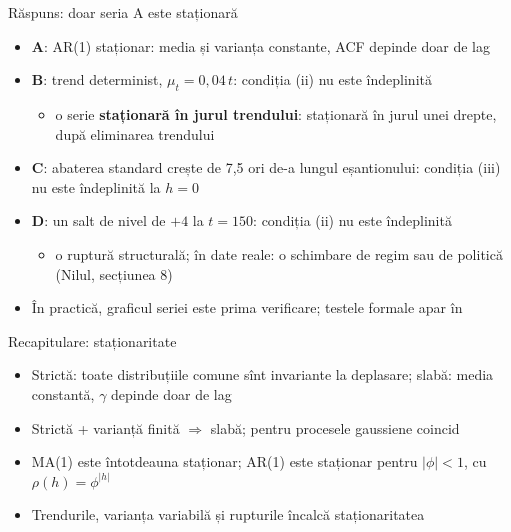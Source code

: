 \begin{frame}{Răspuns: doar seria A este staționară}
\itemsize{\small}
\begin{itemize}
    \item \textbf{A}: AR(1) staționar: media și varianța constante, ACF depinde doar de lag
    \item \textbf{B}: trend determinist, $\mu_t = 0{,}04\,t$: condiția (ii) nu este îndeplinită
    \begin{itemize}
        \item o serie \textbf{staționară în jurul trendului}: staționară în jurul unei drepte, după eliminarea trendului
    \end{itemize}
    \item \textbf{C}: abaterea standard crește de 7{,}5 ori de-a lungul eșantionului: condiția (iii) nu este îndeplinită la $h = 0$
    \item \textbf{D}: un salt de nivel de $+4$ la $t = 150$: condiția (ii) nu este îndeplinită
    \begin{itemize}
        \item o ruptură structurală; în date reale: o schimbare de regim sau de politică (Nilul, secțiunea 8)
    \end{itemize}
    \item În practică, graficul seriei este prima verificare; testele formale apar în 
\end{itemize}
\end{frame}

\begin{frame}{Recapitulare: staționaritate}
\itemsize{\small}
\begin{itemize}
    \item Strictă: toate distribuțiile comune sînt invariante la deplasare; slabă: media constantă, $\gamma$ depinde doar de lag
    \item Strictă + varianță finită $\Rightarrow$ slabă; pentru procesele gaussiene coincid
    \item MA(1) este întotdeauna staționar; AR(1) este staționar pentru $|\phi| < 1$, cu $\rho(h) = \phi^{|h|}$
    \item Trendurile, varianța variabilă și rupturile încalcă staționaritatea
\end{itemize}
\end{frame}


